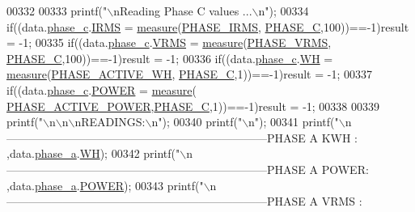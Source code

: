 \begin{DoxyCode}
{{{{{{00332          
00333          printf(\textcolor{stringliteral}{"\(\backslash\)nReading Phase C values ...\(\backslash\)n"});  
00334          \textcolor{keywordflow}{if}((data.\hyperlink{a00028_ad8892f27909cf51f7603adfc00d224df}{phase\_c}.\hyperlink{a00029_a4f87f30b543e89e2e5dfa1b8f3f58eff}{IRMS}           = \hyperlink{a00008_gac914ebaa64afce03ee852af09659cf69}{measure}(\hyperlink{a00042_a15c9ccf287820001431c33c4bb25a23b}{PHASE\_IRMS},
      \hyperlink{a00042_a3ceb83fb10c2af19b468d508448f24e2}{PHASE\_C},100))==-1)result = -1;
00335          \textcolor{keywordflow}{if}((data.\hyperlink{a00028_ad8892f27909cf51f7603adfc00d224df}{phase\_c}.\hyperlink{a00029_a08415029e214174a01bc6487ff98ee9b}{VRMS}           = \hyperlink{a00008_gac914ebaa64afce03ee852af09659cf69}{measure}(\hyperlink{a00042_af0c09c5a455410e6fbd35fd55221338f}{PHASE\_VRMS},
      \hyperlink{a00042_a3ceb83fb10c2af19b468d508448f24e2}{PHASE\_C},100))==-1)result = -1;
00336          \textcolor{keywordflow}{if}((data.\hyperlink{a00028_ad8892f27909cf51f7603adfc00d224df}{phase\_c}.\hyperlink{a00029_a8dd6d8406db4e214238b3eff481e4ea0}{WH}           = \hyperlink{a00008_gac914ebaa64afce03ee852af09659cf69}{measure}(\hyperlink{a00042_a4ee773ad07fa969b9990f9bb3a1a2093}{PHASE\_ACTIVE\_WH},
      \hyperlink{a00042_a3ceb83fb10c2af19b468d508448f24e2}{PHASE\_C},1))==-1)result = -1;
00337          \textcolor{keywordflow}{if}((data.\hyperlink{a00028_ad8892f27909cf51f7603adfc00d224df}{phase\_c}.\hyperlink{a00029_a8a9794fa4c6a69b457d1eb04b017ef1e}{POWER}         = \hyperlink{a00008_gac914ebaa64afce03ee852af09659cf69}{measure}(
      \hyperlink{a00042_abd3f95c7cd63d0627552d293bf49e026}{PHASE\_ACTIVE\_POWER},\hyperlink{a00042_a3ceb83fb10c2af19b468d508448f24e2}{PHASE\_C},1))==-1)result = -1;
00338          
00339         printf(\textcolor{stringliteral}{"\(\backslash\)n\(\backslash\)n\(\backslash\)nREADINGS:\(\backslash\)n"});
00340         printf(\textcolor{stringliteral}{"\(\backslash\)n"});       
00341         printf(\textcolor{stringliteral}{"\(\backslash\)n---------------------------------------------------------------------PHASE A KWH  : %
      ,data.\hyperlink{a00028_ad7205e9853a503d2fab0697f5a301f6c}{phase\_a}.\hyperlink{a00029_a8dd6d8406db4e214238b3eff481e4ea0}{WH});
00342         printf(\textcolor{stringliteral}{"\(\backslash\)n---------------------------------------------------------------------PHASE A POWER: %
      ,data.\hyperlink{a00028_ad7205e9853a503d2fab0697f5a301f6c}{phase\_a}.\hyperlink{a00029_a8a9794fa4c6a69b457d1eb04b017ef1e}{POWER});
00343         printf(\textcolor{stringliteral}{"\(\backslash\)n---------------------------------------------------------------------PHASE A VRMS : %
}}}}}}}}}
\end{DoxyCode}
